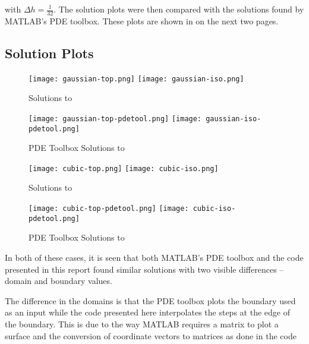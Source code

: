 \documentclass[10pt,a4paper]{article}
\begin{document}
with $\Delta h = \frac{1}{32}$. The solution plots were then compared with the solutions found by MATLAB's PDE toolbox. These plots are shown in  on the next two pages.


\pagebreak
\subsection*{Solution Plots}

\begin{figure}[H]
\texttt{[image: gaussian-top.png]}
\texttt{[image: gaussian-iso.png]}
\caption{Solutions to }
\label{fig: gaussian solutions}
\end{figure}

\begin{figure}[H]
\texttt{[image: gaussian-top-pdetool.png]}
\texttt{[image: gaussian-iso-pdetool.png]}
\caption{PDE Toolbox Solutions to }
\label{fig: pdetool gaussian solutions}
\end{figure}

\begin{figure}[H]
\texttt{[image: cubic-top.png]}
\texttt{[image: cubic-iso.png]}
\caption{Solutions to }
\label{fig: cubic solutions}
\end{figure}

\begin{figure}[H]
\texttt{[image: cubic-top-pdetool.png]}
\texttt{[image: cubic-iso-pdetool.png]}
\caption{PDE Toolbox Solutions to }
\label{fig: pdetool cubic solutions}
\end{figure}

In both of these cases, it is seen that both MATLAB's PDE toolbox and the code presented in this report found similar solutions with two visible differences -- domain and boundary values.

The difference in the domains is that the PDE toolbox plots the boundary used as an input while the code presented here interpolates the steps at the edge of the boundary. This is due to the way MATLAB requires a matrix to plot a surface and the conversion of coordinate vectors to matrices as done in the code


\end{document}
